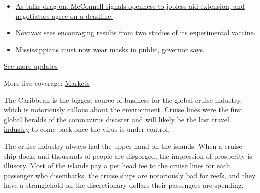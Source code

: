\begin{itemize}
\tightlist
\item
  \href{https://www.nytimes3xbfgragh.onion/2020/08/04/world/coronavirus-cases.html?action=click\&pgtype=Article\&state=default\&region=MAIN_CONTENT_1\&context=storylines_live_updates\#link-762df92}{As
  talks drag on, McConnell signals openness to jobless aid extension,
  and negotiators agree on a deadline.}
\item
  \href{https://www.nytimes3xbfgragh.onion/2020/08/04/world/coronavirus-cases.html?action=click\&pgtype=Article\&state=default\&region=MAIN_CONTENT_1\&context=storylines_live_updates\#link-1228a480}{Novavax
  sees encouraging results from two studies of its experimental
  vaccine.}
\item
  \href{https://www.nytimes3xbfgragh.onion/2020/08/04/world/coronavirus-cases.html?action=click\&pgtype=Article\&state=default\&region=MAIN_CONTENT_1\&context=storylines_live_updates\#link-794484ed}{Mississippians
  must now wear masks in public, governor says.}
\end{itemize}

\href{https://www.nytimes3xbfgragh.onion/2020/08/04/world/coronavirus-cases.html?action=click\&pgtype=Article\&state=default\&region=MAIN_CONTENT_1\&context=storylines_live_updates}{See
more updates}

More live coverage:
\href{https://www.nytimes3xbfgragh.onion/live/2020/08/04/business/stock-market-today-coronavirus?action=click\&pgtype=Article\&state=default\&region=MAIN_CONTENT_1\&context=storylines_live_updates}{Markets}

The Caribbean is the biggest source of business for the global cruise
industry, which is notoriously callous about the environment. Cruise
lines were the
\href{https://www.nytimes3xbfgragh.onion/2020/03/19/travel/coronavirus-cruise-costa-luminosa.html}{first
global heralds} of the coronavirus disaster and will likely be
\href{https://www.nytimes3xbfgragh.onion/2020/06/26/travel/coronavirus-cruises-reopening.html}{the
last travel industry} to come back once the virus is under control.

The cruise industry always had the upper hand on the islands. When a
cruise ship docks and thousands of people are disgorged, the impression
of prosperity is illusory. Most of the islands pay a per head fee to the
cruise lines for each passenger who disembarks, the cruise ships are
notoriously bad for reefs, and they have a stranglehold on the
discretionary dollars their passengers are spending.

